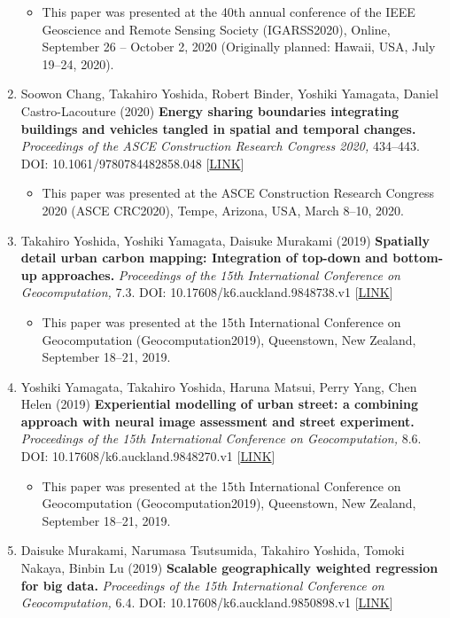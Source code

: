 \documentclass[
]{book}
\providecommand{\tightlist}{%
  \setlength{\itemsep}{0pt}\setlength{\parskip}{0pt}}
\begin{document}
\begin{enumerate}
  \begin{itemize}
  \tightlist
  \item
    This paper was presented at the 40th annual conference of the IEEE Geoscience and Remote Sensing Society (IGARSS2020), Online, September 26 -- October 2, 2020 (Originally planned: Hawaii, USA, July 19--24, 2020).
  \end{itemize}
\item
  Soowon Chang, Takahiro Yoshida, Robert Binder, Yoshiki Yamagata, Daniel Castro-Lacouture (2020)
  \textbf{Energy sharing boundaries integrating buildings and vehicles tangled in spatial and temporal changes.}
  \emph{Proceedings of the ASCE Construction Research Congress 2020,} 434--443.
  DOI: 10.1061/9780784482858.048 {[}\href{https://ascelibrary.org/doi/10.1061/9780784482858.048}{LINK}{]}

  \begin{itemize}
  \tightlist
  \item
    This paper was presented at the ASCE Construction Research Congress 2020 (ASCE CRC2020), Tempe, Arizona, USA, March 8--10, 2020.
  \end{itemize}
\item
  Takahiro Yoshida, Yoshiki Yamagata, Daisuke Murakami (2019)
  \textbf{Spatially detail urban carbon mapping: Integration of top-down and bottom-up approaches.}
  \emph{Proceedings of the 15th International Conference on Geocomputation,} 7.3.
  DOI: 10.17608/k6.auckland.9848738.v1 {[}\href{https://doi.org/10.17608/k6.auckland.9848738.v1}{LINK}{]}

  \begin{itemize}
  \tightlist
  \item
    This paper was presented at the 15th International Conference on Geocomputation (Geocomputation2019), Queenstown, New Zealand, September 18--21, 2019.
  \end{itemize}
\item
  Yoshiki Yamagata, Takahiro Yoshida, Haruna Matsui, Perry Yang, Chen Helen (2019)
  \textbf{Experiential modelling of urban street: a combining approach with neural image assessment and street experiment.}
  \emph{Proceedings of the 15th International Conference on Geocomputation,} 8.6.
  DOI: 10.17608/k6.auckland.9848270.v1 {[}\href{https://doi.org/10.17608/k6.auckland.9848270.v1}{LINK}{]}

  \begin{itemize}
  \tightlist
  \item
    This paper was presented at the 15th International Conference on Geocomputation (Geocomputation2019), Queenstown, New Zealand, September 18--21, 2019.
  \end{itemize}
\item
  Daisuke Murakami, Narumasa Tsutsumida, Takahiro Yoshida, Tomoki Nakaya, Binbin Lu (2019)
  \textbf{Scalable geographically weighted regression for big data.}
  \emph{Proceedings of the 15th International Conference on Geocomputation,} 6.4.
  DOI: 10.17608/k6.auckland.9850898.v1 {[}\href{https://doi.org/10.17608/k6.auckland.9850898.v1}{LINK}{]}


\end{enumerate}
\end{document}
